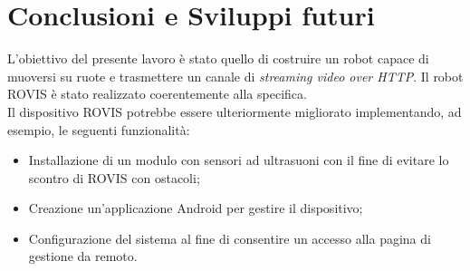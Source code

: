 \documentclass[11pt]{article}
\begin{document}
\section{Conclusioni e Sviluppi futuri}
L'obiettivo del presente lavoro è stato quello di costruire un robot capace di muoversi su ruote e trasmettere un canale di \textit{streaming video over HTTP}. Il robot ROVIS è stato realizzato coerentemente alla specifica.\\
Il dispositivo ROVIS potrebbe essere ulteriormente migliorato implementando, ad esempio, le seguenti funzionalità:
\begin{itemize}
	\item Installazione di un modulo con sensori ad ultrasuoni con il fine di evitare lo scontro di ROVIS con ostacoli;
	\item Creazione un'applicazione Android per gestire il dispositivo;
	\item Configurazione del sistema al fine di consentire un accesso alla pagina di gestione da remoto.
\end{itemize}

%
%
\end{document}
